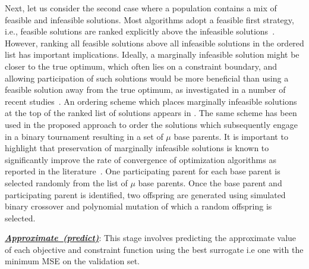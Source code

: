 \documentclass[twocolumn,10pt]{asme2ej}
\begin{document}
Next, let us consider the second case where a population contains a mix of feasible and infeasible solutions. Most algorithms adopt a feasible first strategy, i.e., feasible solutions are ranked explicitly above the infeasible solutions~\cite{deb2001multi}. However, ranking all feasible solutions above all infeasible solutions in the ordered list has important implications\cite{KHTSingh2013idea}. Ideally, a marginally infeasible solution might be closer to the true optimum, which often lies on a constraint boundary, and allowing participation of such solutions would be more beneficial than using a feasible solution away from the true optimum, as investigated in a number of recent studies~\cite{KHTsingh2016use}. An ordering scheme which places marginally infeasible solutions at the top of the ranked list of solutions appears in \cite{KHTSingh2013idea,KHTRay2009idea}. The same scheme has been used in the proposed approach to order the solutions which subsequently engage in a binary tournament resulting in a set of $\mu$ base parents. It is important to highlight that preservation of marginally infeasible solutions is known to significantly improve the rate of convergence of optimization algorithms as reported in the literature~\cite{KHTsingh2016use, KHTtakahama2005constrained,KHTRay2009idea}. One participating parent for each base parent is selected randomly from the list of $\mu$ base parents. Once the base parent and participating parent is identified, two offspring are generated using simulated binary crossover and polynomial mutation of which a random offspring is selected.  
	
\noindent \underline{\it \textbf{Approximate~(predict)}}: {\color{blue}This stage involves predicting the approximate value of each objective and constraint function using the best surrogate i.e one with the minimum MSE on the validation set.}
	
\end{document}
